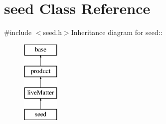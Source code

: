 \hypertarget{classseed}{
\section{seed Class Reference}
\label{classseed}
}


{\ttfamily \#include $<$seed.h$>$}Inheritance diagram for seed::\begin{figure}[H]
\begin{center}
\leavevmode
\includegraphics[height=4cm]{classseed}
\end{center}
\end{figure}
